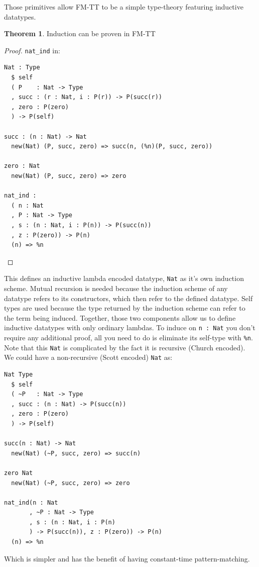 \documentclass{article}
\theoremstyle{definition}
\theoremstyle{theorem}
\newtheorem{theorem}{Theorem}
\begin{document}
Those primitives allow FM-TT to be a simple type-theory featuring inductive
datatypes.

\begin{theorem} Induction can be proven in FM-TT
\end{theorem}

\begin{proof} \verb|nat_ind| in:

\begin{lstlisting}
Nat : Type
  $ self
  ( P    : Nat -> Type
  , succ : (r : Nat, i : P(r)) -> P(succ(r))
  , zero : P(zero)
  ) -> P(self)

succ : (n : Nat) -> Nat
  new(Nat) (P, succ, zero) => succ(n, (%n)(P, succ, zero))

zero : Nat
  new(Nat) (P, succ, zero) => zero

nat_ind :
  ( n : Nat
  , P : Nat -> Type
  , s : (n : Nat, i : P(n)) -> P(succ(n))
  , z : P(zero)) -> P(n)
  (n) => %n
\end{lstlisting}
\end{proof}

This defines an inductive lambda encoded datatype, \verb|Nat| as it's own
induction scheme. Mutual recursion is needed because the induction scheme of any
datatype refers to its constructors, which then refer to the defined datatype.
Self types are used because the type returned by the induction scheme can refer
to the term being induced. Together, those two components allow us to define
inductive datatypes with only ordinary lambdas. To induce on \verb|n : Nat| you
don't require any additional proof, all you need to do is eliminate its
self-type with \verb|%n|.  Note that this \verb|Nat| is complicated by the fact
it is recursive (Church encoded). We could have a non-recursive (Scott encoded)
\verb|Nat| as:

\begin{lstlisting}
Nat Type
  $ self
  ( ~P   : Nat -> Type
  , succ : (n : Nat) -> P(succ(n))
  , zero : P(zero)
  ) -> P(self)

succ(n : Nat) -> Nat
  new(Nat) (~P, succ, zero) => succ(n)

zero Nat
  new(Nat) (~P, succ, zero) => zero

nat_ind(n : Nat
       , ~P : Nat -> Type
       , s : (n : Nat, i : P(n)
       ) -> P(succ(n)), z : P(zero)) -> P(n)
  (n) => %n
\end{lstlisting}

Which is simpler and has the benefit of having constant-time pattern-matching.
\end{document}
